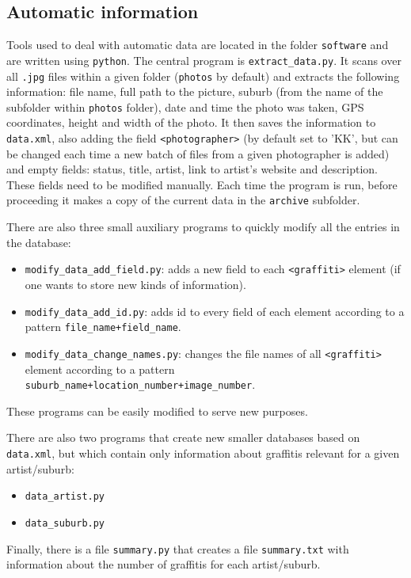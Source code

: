 \documentclass[pra,aps,onecolumn,letter,nopacs,nofootinbib,longbibliography,notitlepage]{revtex4-1}
\theoremstyle{plain}
\theoremstyle{definition}
\begin{document}
\subsection{Automatic information}

Tools used to deal with automatic data are located in the folder \texttt{software} and are written using \texttt{python}. The central program is \texttt{extract\_data.py}. It scans over all \texttt{.jpg} files within a given folder (\texttt{photos} by default) and extracts the following information: file name, full path to the picture, suburb (from the name of the  subfolder within \texttt{photos} folder), date and time the photo was taken, GPS coordinates, height and width of the photo. It then saves the information to \texttt{data.xml}, also adding the field \texttt{<photographer>} (by default set to 'KK', but can be changed each time a new batch of files from a given photographer is added) and empty fields: status, title, artist, link to artist's website and description. These fields need to be modified manually. Each time the program is run, before proceeding it makes a copy of the current data in the \texttt{archive} subfolder.

There are also three small auxiliary programs to quickly modify all the entries in the database: 
\begin{itemize}
	\item \texttt{modify\_data\_add\_field.py}: adds a new field to each \texttt{<graffiti>} element (if one wants to store new kinds of information).
	\item \texttt{modify\_data\_add\_id.py}: adds id to every field of each element according to a pattern \texttt{file\_name+field\_name}.
	\item \texttt{modify\_data\_change\_names.py}: changes the file names of all \texttt{<graffiti>} element according to a pattern \texttt{suburb\_name+location\_number+image\_number}.
\end{itemize}
These programs can be easily modified to serve new purposes.

There are also two programs that create new smaller databases based on \texttt{data.xml}, but which contain only information about graffitis relevant for a given artist/suburb:
\begin{itemize}
	\item \texttt{data\_artist.py}
	\item \texttt{data\_suburb.py}
\end{itemize}

Finally, there is a file \texttt{summary.py} that creates a file \texttt{summary.txt} with information about the number of graffitis for each artist/suburb.
\end{document}
